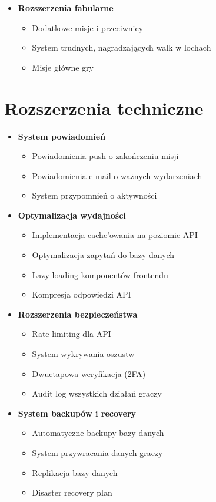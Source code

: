 \begin{itemize}
    \item \textbf{Rozszerzenia fabularne}
    \begin{itemize}
        \item Dodatkowe misje i przeciwnicy
        \item System trudnych, nagradzających walk w lochach
        \item Misje główne gry
    \end{itemize}
\end{itemize}

\section{Rozszerzenia techniczne}

\begin{itemize}
    \item \textbf{System powiadomień}
    \begin{itemize}
        \item Powiadomienia push o zakończeniu misji
        \item Powiadomienia e-mail o ważnych wydarzeniach
        \item System przypomnień o aktywności
    \end{itemize}

    \item \textbf{Optymalizacja wydajności}
    \begin{itemize}
        \item Implementacja cache'owania na poziomie API
        \item Optymalizacja zapytań do bazy danych
        \item Lazy loading komponentów frontendu
        \item Kompresja odpowiedzi API
    \end{itemize}

    \item \textbf{Rozszerzenia bezpieczeństwa}
    \begin{itemize}
        \item Rate limiting dla API
        \item System wykrywania oszustw
        \item Dwuetapowa weryfikacja (2FA)
        \item Audit log wszystkich działań graczy
    \end{itemize}

    \item \textbf{System backupów i recovery}
    \begin{itemize}
        \item Automatyczne backupy bazy danych
        \item System przywracania danych graczy
        \item Replikacja bazy danych
        \item Disaster recovery plan
    \end{itemize}
\end{itemize}

